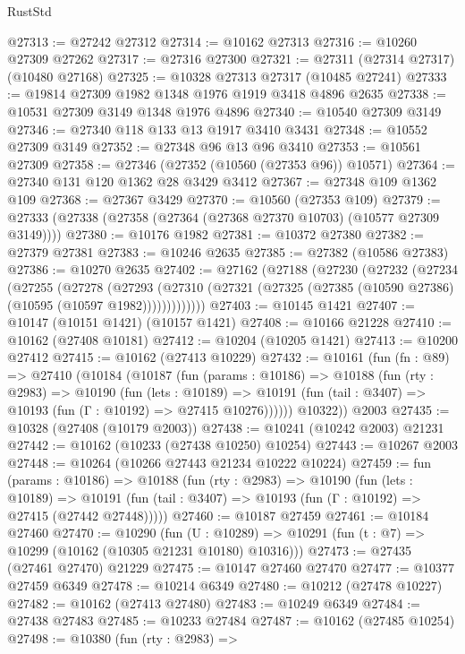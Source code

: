\begin{lexlean}{RustStd}
\begin{coremodule}
@27313 := @27242 @27312
@27314 := @10162 @27313
@27316 := @10260 @27309 @27262
@27317 := @27316 @27300
@27321 := @27311 (@27314 @27317) (@10480 @27168)
@27325 := @10328 @27313 @27317 (@10485 @27241)
@27333 := @19814 @27309 @1982 @1348 @1976 @1919 @3418 @4896 @2635
@27338 := @10531 @27309 @3149 @1348 @1976 @4896
@27340 := @10540 @27309 @3149
@27346 := @27340 @118 @133 @13 @1917 @3410 @3431
@27348 := @10552 @27309 @3149
@27352 := @27348 @96 @13 @96 @3410
@27353 := @10561 @27309
@27358 := @27346 (@27352 (@10560 (@27353 @96)) @10571)
@27364 := @27340 @131 @120 @1362 @28 @3429 @3412
@27367 := @27348 @109 @1362 @109
@27368 := @27367 @3429
@27370 := @10560 (@27353 @109)
@27379 := @27333 (@27338 (@27358 (@27364 (@27368 @27370 @10703) (@10577 @27309 @3149))))
@27380 := @10176 @1982
@27381 := @10372 @27380
@27382 := @27379 @27381
@27383 := @10246 @2635
@27385 := @27382 (@10586 @27383)
@27386 := @10270 @2635
@27402 := @27162
    (@27188
      (@27230
        (@27232
          (@27234
            (@27255
              (@27278
                (@27293
                  (@27310 (@27321 (@27325 (@27385 (@10590 @27386) (@10595 (@10597 @1982)))))))))))))
@27403 := @10145 @1421
@27407 := @10147 (@10151 @1421) (@10157 @1421)
@27408 := @10166 @21228
@27410 := @10162 (@27408 @10181)
@27412 := @10204 (@10205 @1421)
@27413 := @10200 @27412
@27415 := @10162 (@27413 @10229)
@27432 := @10161
    (fun (fn : @89) =>
    @27410
      (@10184
        (@10187
          (fun (params : @10186) =>
          @10188
            (fun (rty : @2983) =>
            @10190
              (fun (lets : @10189) =>
              @10191 (fun (tail : @3407) => @10193 (fun (Γ : @10192) => @27415 @10276))))))
        @10322))
    @2003
@27435 := @10328 (@27408 (@10179 @2003))
@27438 := @10241 (@10242 @2003) @21231
@27442 := @10162 (@10233 (@27438 @10250) @10254)
@27443 := @10267 @2003
@27448 := @10264 (@10266 @27443 @21234 @10222 @10224)
@27459 := fun (params : @10186) =>
  @10188
    (fun (rty : @2983) =>
    @10190
      (fun (lets : @10189) =>
      @10191 (fun (tail : @3407) => @10193 (fun (Γ : @10192) => @27415 (@27442 @27448)))))
@27460 := @10187 @27459
@27461 := @10184 @27460
@27470 := @10290
    (fun (U : @10289) => @10291 (fun (t : @7) => @10299 (@10162 (@10305 @21231 @10180) @10316)))
@27473 := @27435 (@27461 @27470) @21229
@27475 := @10147 @27460 @27470
@27477 := @10377 @27459 @6349
@27478 := @10214 @6349
@27480 := @10212 (@27478 @10227)
@27482 := @10162 (@27413 @27480)
@27483 := @10249 @6349
@27484 := @27438 @27483
@27485 := @10233 @27484
@27487 := @10162 (@27485 @10254)
@27498 := @10380
    (fun (rty : @2983) =>

\end{coremodule}
\end{lexlean}
